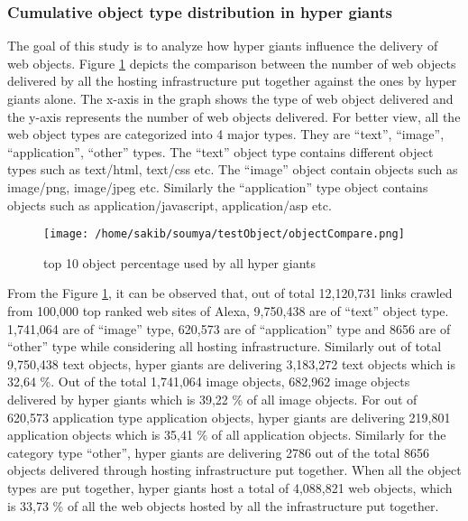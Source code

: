 \subsubsection{Cumulative object type distribution in hyper giants}
\noindent The goal of this study is to analyze how hyper giants influence the delivery of web objects. Figure \ref{fig:Topobject} depicts the comparison between the number of web objects delivered by all the hosting infrastructure put together against the ones by hyper giants alone. The x-axis in the graph shows the type of web object delivered and the y-axis represents the number of web objects delivered. For better view, all the web object types are categorized into 4 major types. They are \enquote{text}, \enquote{image}, \enquote{application}, \enquote{other} types. The \enquote{text} object type contains different object types such as text/html, text/css etc. The \enquote{image} object contain objects such as image/png, image/jpeg etc. Similarly the \enquote{application} type object contains objects such as application/javascript, application/asp etc.

\begin{figure}[htb]
  \centering
  \texttt{[image: /home/sakib/soumya/testObject/objectCompare.png]}\\
  \caption{top 10 object percentage used by all hyper giants}
  \label{fig:Topobject}
\end{figure}

\noindent From the Figure \ref{fig:Topobject}, it can be observed that, out of total 12,120,731 links crawled from 100,000 top ranked web sites of Alexa, 9,750,438 are of \enquote{text} object type. 1,741,064 are of \enquote{image} type, 620,573 are of \enquote{application} type and 8656 are of \enquote{other} type while considering all hosting infrastructure. Similarly out of total 9,750,438 text objects, hyper giants are delivering 3,183,272 text objects which is 32,64 \%. Out of the total 1,741,064 image objects, 682,962 image objects delivered by hyper giants which is 39,22 \% of all image objects. For out of 620,573 application type application objects, hyper giants are delivering 219,801 application objects which is 35,41 \% of all application objects. Similarly for the category type \enquote{other}, hyper giants are delivering 2786 out of the total 8656 objects delivered through hosting infrastructure put together. When all the object types are put together, hyper giants host a total of  4,088,821 web objects, which is 33,73 \% of all the web objects hosted by all the infrastructure put together.


